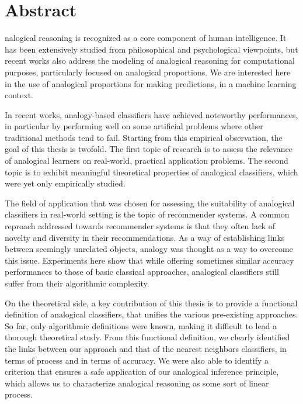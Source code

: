 \chapter*{Abstract}

nalogical reasoning is recognized as a core component of human
intelligence. It has been extensively studied from philosophical and
psychological viewpoints, but recent works also address the modeling of
analogical reasoning for computational purposes, particularly focused on
analogical proportions. We are interested here in the use of analogical
proportions for making predictions, in a machine learning context.

In recent works, analogy-based classifiers have achieved noteworthy
performances, in particular by performing well on some artificial problems
where other traditional methods tend to fail. Starting from
this empirical observation, the goal of this thesis is twofold. The first topic
of research is to assess the relevance of analogical learners on real-world,
practical application problems.  The second topic is to exhibit meaningful
theoretical properties of analogical classifiers, which were yet only
empirically studied.

The field of application that was chosen for assessing the suitability of
analogical classifiers in real-world setting is the topic of recommender
systems. A common reproach addressed towards recommender systems is that they
often lack of novelty and diversity in their recommendations. As a way of
establishing links between seemingly unrelated objects, analogy was thought as
a way to overcome this issue. Experiments here show that while offering
sometimes similar accuracy performances to those of basic classical approaches,
analogical classifiers still suffer from their algorithmic complexity.

On the theoretical side, a key contribution of this thesis is to provide a
functional definition of analogical classifiers, that unifies the various
pre-existing approaches. So far, only algorithmic definitions were known, making
it difficult to lead a thorough theoretical study. From this functional
definition, we clearly identified the links between our approach and that of
the nearest neighbors classifiers, in terms of process and in terms of accuracy.
We were also able to identify a criterion that ensures a safe application of our
analogical inference principle, which allows us to characterize analogical
reasoning as some sort of linear process.
\newpage

